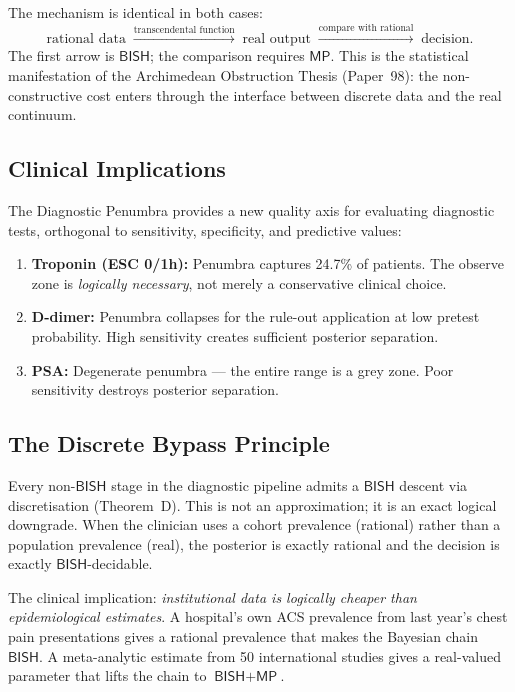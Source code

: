 \documentclass[11pt,a4paper]{article}
\theoremstyle{plain}
\theoremstyle{definition}
\newcommand{\BISH}{\textsf{BISH}}
\newcommand{\MP}{\textsf{MP}}
\begin{document}
The mechanism is identical in both cases:
\[
  \text{rational data} \;\xrightarrow{\text{transcendental function}}\; \text{real output} \;\xrightarrow{\text{compare with rational}}\; \text{decision}.
\]
The first arrow is $\BISH$; the comparison requires $\MP$.  This is the statistical manifestation of the Archimedean Obstruction Thesis (Paper~98): the non-constructive cost enters through the interface between discrete data and the real continuum.

\subsection{Clinical Implications}

The Diagnostic Penumbra provides a new quality axis for evaluating diagnostic tests, orthogonal to sensitivity, specificity, and predictive values:

\begin{enumerate}[nosep]
\item \textbf{Troponin (ESC 0/1h):} Penumbra captures 24.7\% of patients.  The observe zone is \emph{logically necessary}, not merely a conservative clinical choice.
\item \textbf{D-dimer:} Penumbra collapses for the rule-out application at low pretest probability.  High sensitivity creates sufficient posterior separation.
\item \textbf{PSA:} Degenerate penumbra --- the entire range is a grey zone.  Poor sensitivity destroys posterior separation.
\end{enumerate}

\subsection{The Discrete Bypass Principle}

Every non-$\BISH$ stage in the diagnostic pipeline admits a $\BISH$ descent via discretisation (Theorem~D).  This is not an approximation; it is an exact logical downgrade.  When the clinician uses a cohort prevalence (rational) rather than a population prevalence (real), the posterior is exactly rational and the decision is exactly $\BISH$-decidable.

The clinical implication: \emph{institutional data is logically cheaper than epidemiological estimates}.  A hospital's own ACS prevalence from last year's chest pain presentations gives a rational prevalence that makes the Bayesian chain $\BISH$.  A meta-analytic estimate from 50 international studies gives a real-valued parameter that lifts the chain to $\BISH + \MP$.
\end{document}
